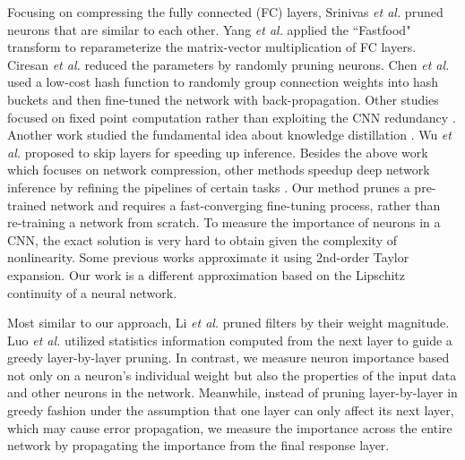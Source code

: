 \documentclass[10pt,twocolumn,letterpaper]{article}
\begin{document}
Focusing on compressing the fully connected (FC) layers, Srinivas \emph{et al.}\cite{Datafree} pruned neurons that are similar to each other.
Yang \emph{et al.}\cite{fry} applied the ``Fastfood" transform to reparameterize the matrix-vector multiplication of FC layers. 
Ciresan \emph{et al.}\cite{random} reduced the parameters by randomly pruning neurons.
Chen \emph{et al.}\cite{hash} used a low-cost hash function to randomly group connection weights into hash buckets and then fine-tuned the network with back-propagation.
Other studies focused on fixed point computation rather than exploiting the CNN redundancy \cite{precision,binary}. Another work studied the fundamental idea about knowledge distillation \cite{Distilling}. Wu \textit{et al.}\cite{Zuxuan} proposed to skip layers for speeding up inference. Besides the above work which focuses on network compression, other methods speedup deep network inference by refining the pipelines of certain tasks \cite{faster,yu1,yu3, ssd}.
Our method prunes a pre-trained network and requires a fast-converging fine-tuning process, rather than re-training a network from scratch.
To measure the importance of neurons in a CNN, the exact solution is very hard to obtain given the complexity of nonlinearity. Some previous works \cite{brain2,brain3,brain} approximate it using 2nd-order Taylor expansion. Our work is a different approximation based on the Lipschitz continuity of a neural network.

Most similar to our approach, Li \emph{et al.}\cite{pruneweigth} pruned filters by their weight magnitude. Luo \emph{et al.}\cite{thinet} utilized statistics information computed from the next layer to guide a greedy layer-by-layer pruning. In contrast, we measure neuron importance based not only on a neuron's individual weight but also the properties of the input data and other neurons in the network. Meanwhile, instead of pruning layer-by-layer in greedy fashion under the assumption that one layer can only affect its next layer, which may cause error propagation, we measure the importance across the entire network by propagating the importance from the final response layer.



% 

% 
\end{document}
